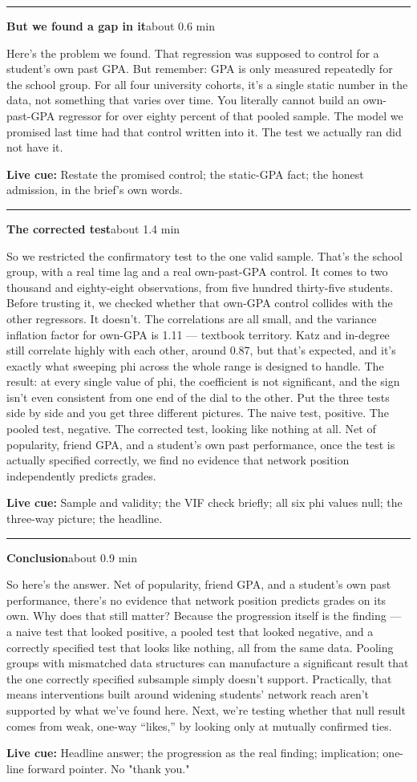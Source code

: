 \documentclass[11pt]{article}
\newcommand{\Cue}[1]{\par\nobreak\smallskip\noindent\textcolor{ScriptGray}{\footnotesize
  \textbf{Live cue:} #1}\par}
\newcommand{\scriptframe}[3]{%
  \Needspace{9\baselineskip}%
  \par\medskip\noindent\textcolor{ScriptBlue}{\rule{\linewidth}{0.55pt}}%
  \par\smallskip\noindent
  \textbf{#1}\hfill\textcolor{ScriptGray}{\small #2}\par\smallskip
  #3\par}
\begin{document}
\scriptframe{But we found a gap in it}{about 0.6 min}{%
  Here's the problem we found. That regression was supposed to control for a
  student's own past GPA. But remember: GPA is only measured repeatedly for
  the school group. For all four university cohorts, it's a single static
  number in the data, not something that varies over time. You literally
  cannot build an own-past-GPA regressor for over eighty percent of that
  pooled sample. The model we promised last time had that control written
  into it. The test we actually ran did not have it.
  \Cue{Restate the promised control; the static-GPA fact; the honest admission, in the brief's own words.}
}

\scriptframe{The corrected test}{about 1.4 min}{%
  So we restricted the confirmatory test to the one valid sample. That's the
  school group, with a real time lag and a real own-past-GPA control. It
  comes to two thousand and eighty-eight observations, from five hundred
  thirty-five students. Before trusting it, we checked
  whether that own-GPA control collides with the other regressors. It
  doesn't. The correlations are all small, and the variance inflation factor
  for own-GPA is 1.11 --- textbook territory. Katz and in-degree still
  correlate highly with each other, around 0.87, but that's expected, and
  it's exactly what sweeping phi across the whole range is designed to
  handle. The result: at every single value of phi, the coefficient is not
  significant, and the sign isn't even consistent from one end of the dial
  to the other. Put the three tests side by side and you get three different
  pictures. The naive test, positive. The pooled test, negative. The
  corrected test, looking like nothing at all. Net of popularity, friend
  GPA, and a student's own past performance, once the test is actually
  specified correctly, we find no evidence that network position
  independently predicts grades.
  \Cue{Sample and validity; the VIF check briefly; all six phi values null; the three-way picture; the headline.}
}

\begin{samepage}
\scriptframe{Conclusion}{about 0.9 min}{%
  So here's the answer. Net of popularity, friend GPA, and a student's own
  past performance, there's no evidence that network position predicts
  grades on its own. Why does that still matter? Because the progression itself is the finding --- a
  naive test that looked positive, a pooled test that looked negative, and a
  correctly specified test that looks like nothing, all from the same data.
  Pooling groups with mismatched data structures can manufacture a
  significant result that the one correctly specified subsample simply
  doesn't support. Practically, that means interventions built around
  widening students' network reach aren't supported by what we've found
  here. Next, we're testing whether that null result comes from weak,
  one-way ``likes,'' by looking only at mutually confirmed ties.
  \Cue{Headline answer; the progression as the real finding; implication; one-line forward pointer. No "thank you."}
}
\end{samepage}
\end{document}
